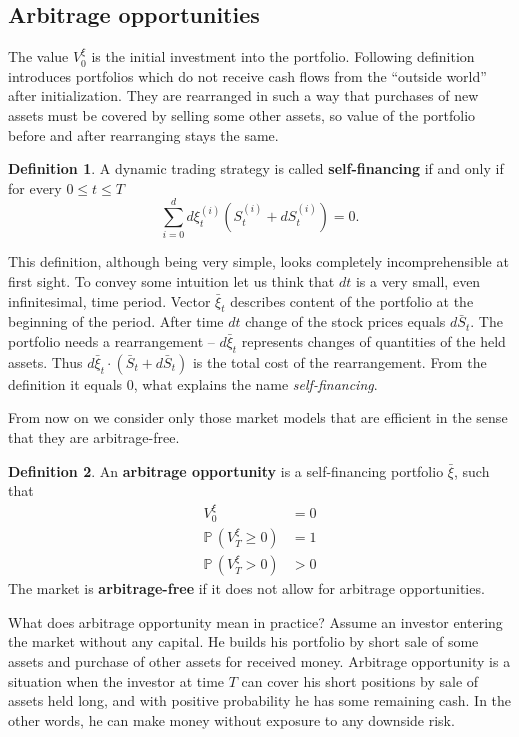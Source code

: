 \documentclass[a4paper,11pt, twoside]{book}
\theoremstyle{definition}
\newtheorem{mydef}{Definition}[chapter]
\theoremstyle{remark}
\def\P{{\mathbb{P}}\,}
\def\Sa{\bar{S}}
\def\xia{\bar{\xi}}
\begin{document}
\subsection{Arbitrage opportunities}
The value $V^{\xi}_0$ is the initial investment into the portfolio. Following definition introduces portfolios which do not receive cash flows from the ``outside world'' after initialization. They are rearranged in such a way that purchases of new assets must be covered by selling some other assets, so value of the portfolio before and after rearranging stays the same.
\begin{mydef}
 A dynamic trading strategy is called \textbf{self-financing} if and only if for every $0 \leq t \leq T$
 \[ \sum\limits_{i=0}^d d\xi^{(i)}_t (S^{(i)}_t + dS^{(i)}_t) = 0. \]
\end{mydef}
This definition, although being very simple, looks completely incomprehensible at first sight. To convey some intuition let us think that $dt$ is a very small, even infinitesimal, time period. Vector $\xia_t$ describes content of the portfolio at the beginning of the period. After time $dt$ change of the stock prices equals $d\Sa_t$. The portfolio needs a rearrangement -- $d\xia_t$ represents changes of quantities of the held assets.
Thus $d\xia_t \cdot (\Sa_t + d\Sa_t)$ is the total cost of the rearrangement. From the definition it equals 0, what explains the name \textit{self-financing}.

From now on we consider only those market models that are efficient in the sense that they are arbitrage-free.
\begin{mydef}
 An \textbf{arbitrage opportunity} is a self-financing portfolio $\xia$, such that
 \begin{align*}
  V^{\xi}_0 &= 0\\
  \P(V^{\xi}_T \geq 0) &= 1\\
  \P(V^{\xi}_T > 0 ) &> 0
 \end{align*}
 The market is \textbf{arbitrage-free} if it does not allow for arbitrage opportunities.
\end{mydef}
What does arbitrage opportunity mean in practice? Assume an investor entering the market without any capital. He builds his portfolio by short sale of some assets and purchase of other assets for received money. Arbitrage opportunity is a situation when the investor at time $T$ can cover his short positions by sale of assets held long, and with positive probability he has some remaining cash.
In the other words, he can make money without exposure to any downside risk. 
\end{document}
